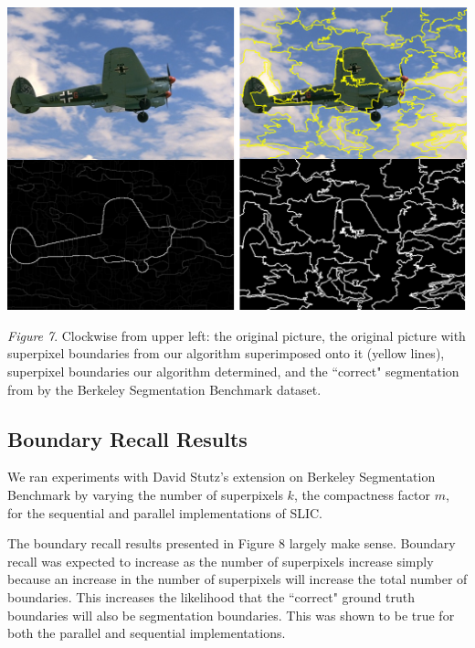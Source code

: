 \documentclass[11pt,twocolumn]{article}
\begin{document}
\begin{center}
\includegraphics[width = \linewidth]{grouped.png}
\end{center}
\textit{Figure 7}. Clockwise from upper left: the original picture, the original picture with superpixel boundaries from our algorithm superimposed onto it (yellow lines), superpixel boundaries our algorithm determined, and the ``correct" segmentation from by the Berkeley Segmentation Benchmark \cite{benchmark} dataset. \\

\subsection{Boundary Recall Results}
We ran experiments with David Stutz's extension on Berkeley Segmentation Benchmark by varying the number of superpixels $k$, the compactness factor $m$, for the sequential and parallel implementations of SLIC.

The boundary recall results presented in Figure 8 largely make sense. Boundary recall was expected to increase as the number of superpixels increase simply because an increase in the number of superpixels will increase the total number of boundaries. This increases the likelihood that the ``correct" ground truth boundaries will also be segmentation boundaries. This was shown to be true for both the parallel and sequential implementations.  
\end{document}
